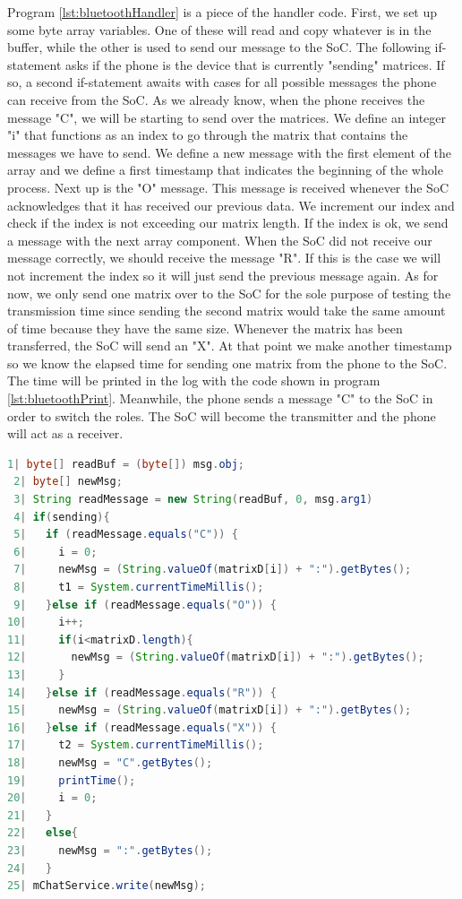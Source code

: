 \documentclass[a4paper, 11pt]{report}
\begin{document}
Program \ref{lst:bluetoothHandler} is a piece of the handler code. First, we set up some byte array variables. One of these will read and copy whatever is in the buffer, while the other is used to send our message to the SoC. The following if-statement asks if the phone is the device that is currently "sending" matrices. If so, a second if-statement awaits with cases for all possible messages the phone can receive from the SoC. As we already know, when the phone receives the message "C", we will be starting to send over the matrices. We define an integer "i" that functions as an index to go through the matrix that contains the messages we have to send. We define a new message with the first element of the array and we define a first timestamp that indicates the beginning of the whole process. Next up is the "O" message. This message is received whenever the SoC acknowledges that it has received our previous data. We increment our index and check if the index is not exceeding our matrix length. If the index is ok, we send a message with the next array component. When the SoC did not receive our message correctly, we should receive the message "R". If this is the case we will not increment the index so it will just send the previous message again. As for now, we only send one matrix over to the SoC for the sole purpose of testing the transmission time since sending the second matrix would take the same amount of time because they have the same size. Whenever the matrix has been transferred, the SoC will send an "X". At that point we make another timestamp so we know the elapsed time for sending one matrix from the phone to the SoC. The time will be printed in the log with the code shown in program \ref{lst:bluetoothPrint}. Meanwhile, the phone sends a message "C" to the SoC in order to switch the roles. The SoC will become the transmitter and the phone will act as a receiver.

\begin{lstlisting}[caption={Bluetooth message handler as transmitter},captionpos=b, label={lst:bluetoothHandler}, language=java, float=ht]
 1| byte[] readBuf = (byte[]) msg.obj;
 2| byte[] newMsg;
 3| String readMessage = new String(readBuf, 0, msg.arg1)
 4| if(sending){
 5|   if (readMessage.equals("C")) {
 6|     i = 0;
 7|     newMsg = (String.valueOf(matrixD[i]) + ":").getBytes();
 8|     t1 = System.currentTimeMillis();
 9|   }else if (readMessage.equals("O")) {
10|     i++;
11|     if(i<matrixD.length){
12|       newMsg = (String.valueOf(matrixD[i]) + ":").getBytes();
13|     }
14|   }else if (readMessage.equals("R")) {
15|     newMsg = (String.valueOf(matrixD[i]) + ":").getBytes();
16|   }else if (readMessage.equals("X")) {
17|     t2 = System.currentTimeMillis();
18|     newMsg = "C".getBytes();
19|     printTime();
20|     i = 0;
21|   }
22|   else{
23|     newMsg = ":".getBytes();
24|   }
25| mChatService.write(newMsg);
\end{lstlisting}
\end{document}
